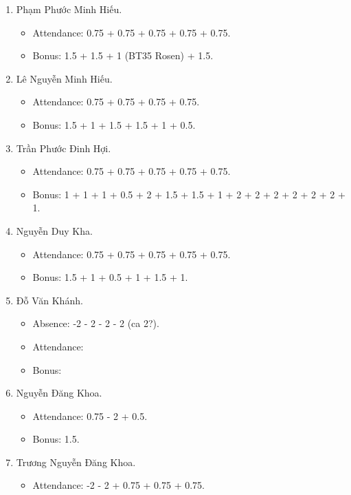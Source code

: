 \documentclass{article}
\begin{document}
\begin{enumerate}
\begin{itemize}
        \item Bonus: 1.5 + 2 + 2 + 2 + 2.
    \end{itemize}
    \item {\sc Phạm Phước Minh Hiếu.}
    \begin{itemize}
        \item Attendance: 0.75 + 0.75 + 0.75 + 0.75 + 0.75.
        \item Bonus: 1.5 + 1.5 + 1 (BT35 Rosen) + 1.5.
    \end{itemize}
    \item {\sc Lê Nguyễn Minh Hiếu.}
    \begin{itemize}
        \item Attendance: 0.75 + 0.75 + 0.75 + 0.75.
        \item Bonus: 1.5 + 1 + 1.5 + 1.5 + 1 + 0.5.
    \end{itemize}
    \item {\sc Trần Phước Đinh Hợi.}
    \begin{itemize}
        \item Attendance: 0.75 + 0.75 + 0.75 + 0.75 + 0.75.
        \item Bonus: 1 + 1 + 1 + 0.5 + 2 + 1.5 + 1.5 + 1 + 2 + 2 + 2 + 2 + 2 + 2 + 1.
    \end{itemize}
    \item {\sc Nguyễn Duy Kha.}
    \begin{itemize}
        \item Attendance: 0.75 + 0.75 + 0.75 + 0.75 + 0.75.
        \item Bonus: 1.5 + 1 + 0.5 + 1 + 1.5 + 1.
    \end{itemize}
    \item {\sc Đỗ Văn Khánh.}
    \begin{itemize}
        \item Absence: -2 - 2 - 2 - 2 (ca 2?).
        \item Attendance:
        \item Bonus:
    \end{itemize}
    \item {\sc Nguyễn Đăng Khoa.}
    \begin{itemize}
        \item Attendance: 0.75 - 2 + 0.5.
        \item Bonus: 1.5.
    \end{itemize}
    \item {\sc Trương Nguyễn Đăng Khoa.}
    \begin{itemize}
        \item Attendance: -2 - 2 + 0.75 + 0.75 + 0.75.

\end{itemize}
\end{enumerate}
\end{document}
